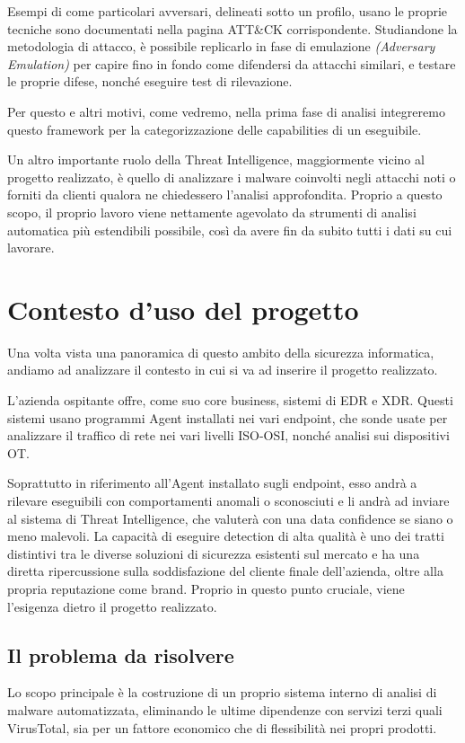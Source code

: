 Esempi di come particolari avversari, delineati sotto un profilo, usano le proprie tecniche sono documentati nella pagina ATT\&CK corrispondente.
Studiandone la metodologia di attacco, è possibile replicarlo in fase di emulazione \emph{(Adversary Emulation)} per capire fino in fondo come difendersi da attacchi similari, e testare le proprie difese, nonché eseguire test di rilevazione.

Per questo e altri motivi, come vedremo, nella prima fase di analisi integreremo questo framework per la categorizzazione delle capabilities di un eseguibile.

\medskip

Un altro importante ruolo della Threat Intelligence, maggiormente vicino al progetto realizzato, è quello di analizzare i malware coinvolti negli attacchi noti o forniti da clienti qualora ne chiedessero l'analisi approfondita. Proprio a questo scopo, il proprio lavoro viene nettamente agevolato da strumenti di analisi automatica più estendibili possibile, così da avere fin da subito tutti i dati su cui lavorare.

\section{Contesto d'uso del progetto}
Una volta vista una panoramica di questo ambito della sicurezza informatica,
andiamo ad analizzare il contesto in cui si va ad inserire il progetto realizzato.

L'azienda ospitante offre, come suo core business, sistemi di EDR e XDR.
Questi sistemi usano programmi Agent installati nei vari endpoint, che sonde usate per analizzare il traffico di rete nei vari livelli ISO-OSI, nonché analisi sui dispositivi OT.

Soprattutto in riferimento all'Agent installato sugli endpoint, esso andrà a rilevare eseguibili con comportamenti anomali o sconosciuti e li andrà ad inviare al sistema di Threat Intelligence, che valuterà con una data confidence se siano o meno malevoli.
La capacità di eseguire detection di alta qualità è uno dei tratti distintivi tra le diverse soluzioni di sicurezza esistenti sul mercato e ha una diretta ripercussione sulla soddisfazione del cliente finale dell'azienda, oltre alla propria reputazione come brand.
Proprio in questo punto cruciale, viene l'esigenza dietro il progetto realizzato.

\subsection{Il problema da risolvere}
Lo scopo principale è la costruzione di un proprio sistema interno di analisi di malware automatizzata, eliminando le ultime dipendenze con servizi terzi quali VirusTotal, sia per un fattore economico che di flessibilità nei propri prodotti.

